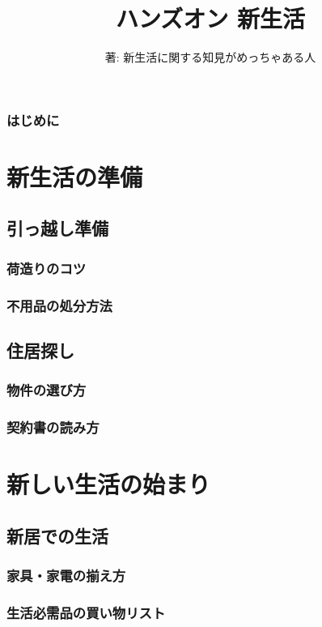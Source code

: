 \documentclass[a4j,oneside,openany]{jsbook}
\title{ハンズオン 新生活}
\author{著: 新生活に関する知見がめっちゃある人}
\date{}
\begin{document}
\maketitle

\tableofcontents
\clearpage
\section{はじめに}

\part{新生活の準備}
\chapter{引っ越し準備}
\section{荷造りのコツ}
\section{不用品の処分方法}

\chapter{住居探し}
\section{物件の選び方}
\section{契約書の読み方}

\part{新しい生活の始まり}
\chapter{新居での生活}
\section{家具・家電の揃え方}
\section{生活必需品の買い物リスト}
\end{document}
